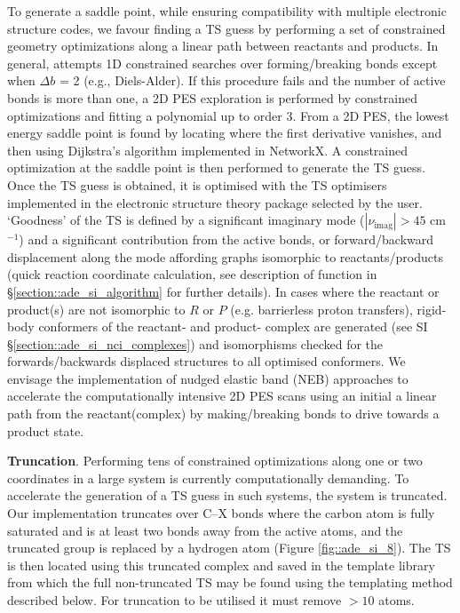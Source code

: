 \documentclass[../../main.tex]{subfiles}
\begin{document}
To generate a saddle point, while ensuring compatibility with multiple electronic structure codes, we favour finding a TS guess by performing a set of constrained geometry optimizations along a linear path between reactants and products. In general, \ade attempts 1D constrained searches over forming/breaking bonds except when $\Delta b$ = 2 (e.g., Diels-Alder). If this procedure fails and the number of active bonds is more than one, a 2D PES exploration is performed by constrained optimizations and fitting a polynomial up to order 3.\cite{SciPy} From a 2D PES, the lowest energy saddle point is found by locating where the first derivative vanishes, and then using Dijkstra's algorithm\cite{Dijkstra1959} implemented in NetworkX.\cite{NetworkX} A constrained optimization at the saddle point is then performed to generate the TS guess. Once the TS guess is obtained, it is optimised with the TS optimisers implemented in the electronic structure theory package selected by the user. ‘Goodness’ of the TS is defined by a significant imaginary mode ($|\nu_\text{imag}| > 45$ cm$^{-1}$) and a significant contribution from the active bonds, or forward/backward displacement along the mode affording graphs isomorphic to reactants/products (quick reaction coordinate calculation,\cite{Goodman2003} see description of  function in §\ref{section::ade_si_algorithm} for further details). In cases where the reactant or product(s) are not isomorphic to $R$ or $P$ (e.g. barrierless proton transfers), rigid-body conformers of the reactant- and product- complex are generated (see SI §\ref{section::ade_si_nci_complexes}) and isomorphisms checked for the forwards/backwards displaced structures to all optimised conformers. We envisage the implementation of nudged elastic band (NEB) approaches to accelerate the computationally intensive 2D PES scans using an initial a linear path from the reactant(complex) by making/breaking bonds to drive towards a product state.


{\textbf{Truncation}}. Performing tens of constrained optimizations along one or two coordinates in a large system is currently computationally demanding. To accelerate the generation of a TS guess in such systems, the system is truncated. Our implementation truncates over C--X bonds where the carbon atom is fully saturated and is at least two bonds away from the active atoms, and the truncated group is replaced by a hydrogen atom (Figure \ref{fig::ade_si_8}). The TS is then located using this truncated complex and saved in the template library from which the full non-truncated TS may be found using the templating method described below. For truncation to be utilised it must remove $>10$ atoms. 
\end{document}
